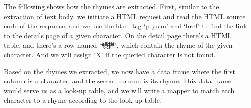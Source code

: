 \documentclass[]{article}
\newenvironment{Shaded}{\begin{snugshade}}{\end{snugshade}}
\newcommand{\ControlFlowTok}[1]{\textcolor[rgb]{0.13,0.29,0.53}{\textbf{#1}}}
\newcommand{\DataTypeTok}[1]{\textcolor[rgb]{0.13,0.29,0.53}{#1}}
\newcommand{\DecValTok}[1]{\textcolor[rgb]{0.00,0.00,0.81}{#1}}
\newcommand{\KeywordTok}[1]{\textcolor[rgb]{0.13,0.29,0.53}{\textbf{#1}}}
\newcommand{\NormalTok}[1]{#1}
\newcommand{\OperatorTok}[1]{\textcolor[rgb]{0.81,0.36,0.00}{\textbf{#1}}}
\newcommand{\StringTok}[1]{\textcolor[rgb]{0.31,0.60,0.02}{#1}}
\begin{document}
The following shows how the rhymes are extracted. First, similar to the
extraction of text body, we initiate a HTML request and read the HTML
source code of the response, and we use the html tag `p yohn' and `href'
to find the link to the details page of a given character. On the detail
page there's a HTML table, and there's a row named `韻攝', which contain
the rhyme of the given character. And we will assign `X' if the queried
character is not found.

\begin{Shaded}
\end{Shaded}

Based on the rhymes we extracted, we now have a data frame where the
first column is a character, and the second column is its rhyme. This
data frame would serve us as a look-up table, and we will write a mapper
to match each character to a rhyme according to the look-up table.

\begin{Shaded}
\end{Shaded}
\end{document}
